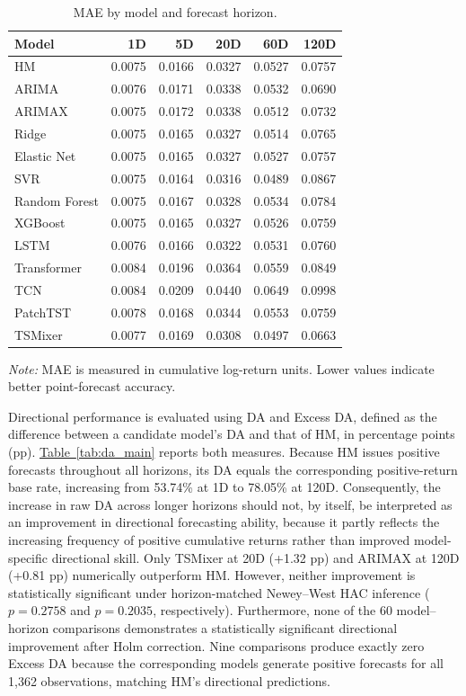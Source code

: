 \documentclass[runningheads,orivec]{llncs}
\begin{document}
\begin{table}[htbp]
\centering
\caption{MAE by model and forecast horizon.}\label{tab:mae_main}
\setlength{\tabcolsep}{4.5pt}
\begin{tabular}{lrrrrr}
\hline
Model & 1D & 5D & 20D & 60D & 120D \\
\hline
HM & 0.0075 & 0.0166 & 0.0327 & 0.0527 & 0.0757 \\
ARIMA & 0.0076 & 0.0171 & 0.0338 & 0.0532 & 0.0690 \\
ARIMAX & 0.0075 & 0.0172 & 0.0338 & 0.0512 & 0.0732 \\
Ridge & 0.0075 & 0.0165 & 0.0327 & 0.0514 & 0.0765 \\
Elastic Net & 0.0075 & 0.0165 & 0.0327 & 0.0527 & 0.0757 \\
SVR & 0.0075 & 0.0164 & 0.0316 & 0.0489 & 0.0867 \\
Random Forest & 0.0075 & 0.0167 & 0.0328 & 0.0534 & 0.0784 \\
XGBoost & 0.0075 & 0.0165 & 0.0327 & 0.0526 & 0.0759 \\
LSTM & 0.0076 & 0.0166 & 0.0322 & 0.0531 & 0.0760 \\
Transformer & 0.0084 & 0.0196 & 0.0364 & 0.0559 & 0.0849 \\
TCN & 0.0084 & 0.0209 & 0.0440 & 0.0649 & 0.0998 \\
PatchTST & 0.0078 & 0.0168 & 0.0344 & 0.0553 & 0.0759 \\
TSMixer & 0.0077 & 0.0169 & 0.0308 & 0.0497 & 0.0663 \\
\hline
\end{tabular}
\par\vspace{4pt}\parbox{0.85\linewidth}{\footnotesize\textit{Note:} MAE is measured in cumulative log-return units. Lower values indicate better point-forecast accuracy.}
\end{table}

Directional performance is evaluated using DA and Excess DA, defined as the difference between a candidate model's DA and that of HM, in percentage points (pp). \hyperref[tab:da_main]{Table~\ref*{tab:da_main}} reports both measures. Because HM issues positive forecasts throughout all horizons, its DA equals the corresponding positive-return base rate, increasing from 53.74\% at 1D to 78.05\% at 120D. Consequently, the increase in raw DA across longer horizons should not, by itself, be interpreted as an improvement in directional forecasting ability, because it partly reflects the increasing frequency of positive cumulative returns rather than improved model-specific directional skill. Only TSMixer at 20D (+1.32 pp) and ARIMAX at 120D (+0.81 pp) numerically outperform HM. However, neither improvement is statistically significant under horizon-matched Newey--West HAC inference ($p=0.2758$ and $p=0.2035$, respectively). Furthermore, none of the 60 model--horizon comparisons demonstrates a statistically significant directional improvement after Holm correction. Nine comparisons produce exactly zero Excess DA because the corresponding models generate positive forecasts for all 1,362 observations, matching HM's directional predictions.
\end{document}
